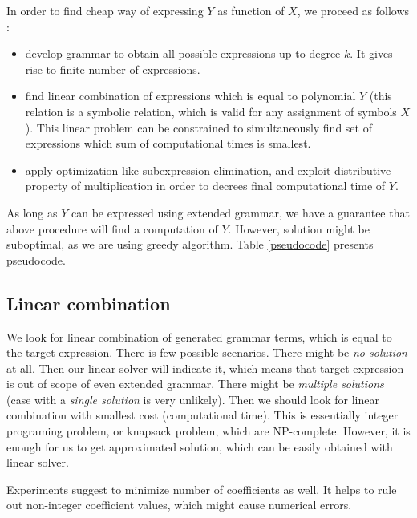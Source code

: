 \documentclass{article}
\begin{document}
In order to find cheap way of expressing $Y$ as function of $X$, we proceed as follows : 
\begin{itemize}
\item develop grammar to obtain all possible expressions up to degree $k$. It gives rise to finite number of expressions.
\item find linear combination of expressions which is equal to polynomial $Y$ (this relation is a symbolic relation, which is valid for any assignment of symbols $X$). This linear problem can be constrained to simultaneously find set of expressions which sum of computational times is smallest.
\item apply optimization like subexpression elimination, and exploit distributive property of multiplication in order to decrees final computational time of $Y$.
\end{itemize}

As long as $Y$ can be expressed using extended grammar, we have a guarantee that above procedure will find a computation of $Y$. However, solution might be suboptimal, as we are using
greedy algorithm. Table \ref{pseudocode} presents pseudocode.


\subsection{Linear combination}
We look for linear combination of generated grammar terms, which is equal to the
target expression. There is few possible scenarios. There might be \emph{no solution} at all. 
Then our linear solver will indicate it, which means that target expression
is out of scope of even extended grammar. There might be \emph{multiple solutions} (case
with a \emph{single solution} is very unlikely). Then we should look for linear combination
with smallest cost (computational time). 
This is essentially integer programing problem, or knapsack problem, which 
are NP-complete. However, it is enough for us to get approximated solution, which can be easily
obtained with linear solver.


Experiments suggest to minimize number of coefficients as well. It helps to rule out
non-integer coefficient values, which might cause numerical errors. 
\end{document}
